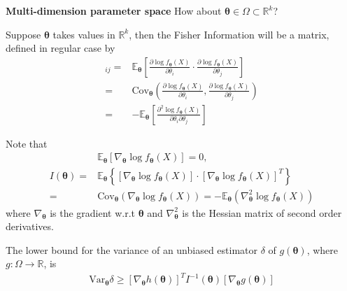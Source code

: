 \begin{example}
    \textbf{Multi-dimension parameter space}
    {\color{red} How about $\boldsymbol{\theta}\in\Omega\subset\mathbb{R}^k$?}
    
    Suppose $\boldsymbol{\theta}$ takes values in $\mathbb{R}^k$, 
    then the Fisher Information will be a matrix,
    defined in regular case by
    \begin{align}
        [I(\boldsymbol{\theta})]_{ij}
        =& \mathbb{E}_{\boldsymbol{\theta}} \left[ 
            \frac{\partial\log{f_{\boldsymbol{\theta}}(X)}}{\partial{\theta_i}} 
            \cdot
            \frac{\partial\log{f_{\boldsymbol{\theta}}(X)}}{\partial{\theta_j}}
        \right] \\
        =& \mathrm{Cov}_{\boldsymbol{\theta}}\left(
            \frac{\partial\log{f_{\boldsymbol{\theta}}(X)}}{\partial{\theta_i}} 
            ,
            \frac{\partial\log{f_{\boldsymbol{\theta}}(X)}}{\partial{\theta_j}}
        \right) \\
        =& -\mathbb{E}_{\boldsymbol{\theta}} \left[
            \frac{\partial^2\log{f_{\boldsymbol{\theta}}(X)}}
            {\partial{\theta_i}\partial{\theta_j}}
        \right]
    \end{align}
    
    Note that 
    \begin{align}
        &\mathbb{E}_{\boldsymbol{\theta}}[\nabla_{\boldsymbol{\theta}}\log{f_{\boldsymbol{\theta}}(X)}]=0,\\
        I(\boldsymbol{\theta})
        =& \mathbb{E}_{\boldsymbol{\theta}}\left\{
            \left[
                \nabla_{\boldsymbol{\theta}}\log{f_{\boldsymbol{\theta}}(X)}
            \right]\cdot\left[
                \nabla_{\boldsymbol{\theta}}\log{f_{\boldsymbol{\theta}}(X)}
            \right]^T
        \right\}\\
        =& \mathrm{Cov}_{\boldsymbol{\theta}}\left(
            \nabla_{\boldsymbol{\theta}}\log{f_{\boldsymbol{\theta}}(X)}
        \right)
        =-\mathbb{E}_{\boldsymbol{\theta}}\left(
            \nabla_{\boldsymbol{\theta}}^2\log{f_{\boldsymbol{\theta}}(X)}
        \right)
    \end{align}
    where $\nabla_{\boldsymbol{\theta}}$ is the gradient w.r.t $\boldsymbol{\theta}$ and 
    $\nabla_{\boldsymbol{\theta}}^2$ is the Hessian matrix of second order derivatives.
    
    The lower bound for the variance of an unbiased estimator $\delta$ of $g(\boldsymbol{\theta})$,
    where $g:\Omega\to\mathbb{R}$, is
    \begin{gather}
        \mathrm{Var}_{\boldsymbol{\theta}}\delta
        \geq [\nabla_{\boldsymbol{\theta}}h({\boldsymbol{\theta}})]^T
        I^{-1}({\boldsymbol{\theta}})
        [\nabla_{\boldsymbol{\theta}}g({\boldsymbol{\theta}})]
    \end{gather}

\end{example}

